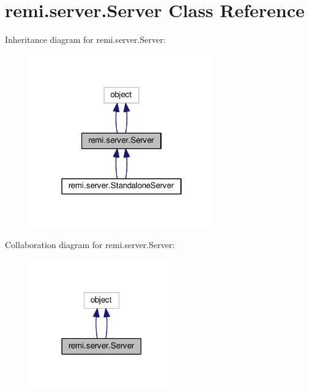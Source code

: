 \hypertarget{classremi_1_1server_1_1Server}{}\section{remi.\+server.\+Server Class Reference}
\label{classremi_1_1server_1_1Server}


Inheritance diagram for remi.\+server.\+Server\+:
\nopagebreak
\begin{figure}[H]
\begin{center}
\leavevmode
\includegraphics[width=226pt]{d0/dc2/classremi_1_1server_1_1Server__inherit__graph}
\end{center}
\end{figure}


Collaboration diagram for remi.\+server.\+Server\+:
\nopagebreak
\begin{figure}[H]
\begin{center}
\leavevmode
\includegraphics[width=177pt]{d9/d56/classremi_1_1server_1_1Server__coll__graph}
\end{center}
\end{figure}

